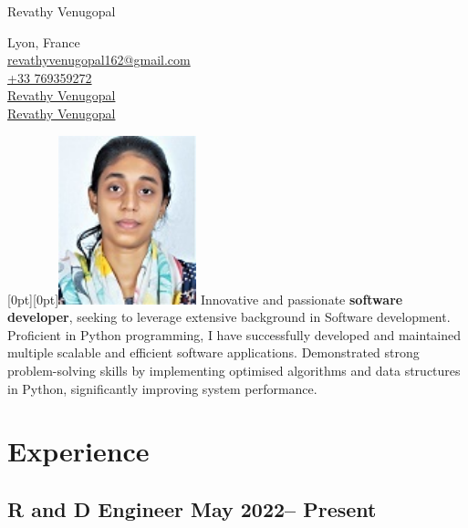 \documentclass[12pt]{article}
\begin{document}

\begin{flushleft}
    {\fontsize{30}{30}\selectfont Revathy Venugopal} \\ \bigskip
    
    {\color{icnclr}\faMapMarker} {Lyon, France} \\ \bigskip
    {\color{icnclr}\faEnvelope[regular]} \href{mailto:revathyvenugopal162@gmail.com}{revathyvenugopal162@gmail.com} \\ \bigskip
    {\color{icnclr}} \href{tel:+33769359272}{+33 769359272} \\ \bigskip
    {\color{icnclr}\faLinkedinIn} \href{https://www.linkedin.com/in/revathy-venugopal-3310b5147/}{Revathy Venugopal}\\ \bigskip
    {\color{icnclr}\faGithub} \href{https://github.com/Revathyvenugopal162/}{Revathy Venugopal}
\end{flushleft}
\noindent
\hfill
\raisebox{0pt}[0pt][0pt]{\includegraphics[width=0.3\textwidth]{../assets/revathy.jpg}}
\noindent
Innovative and passionate \textbf{software developer}, seeking to leverage extensive background in Software development.
Proficient in Python programming, I have successfully developed and maintained multiple scalable and efficient software applications.
Demonstrated strong problem-solving skills by implementing optimised algorithms and data structures in Python, significantly improving system performance.
\section{Experience}
\subsection{R and D Engineer \hfill \normalfont May 2022-- Present} \\ \smallskip
\end{document}
